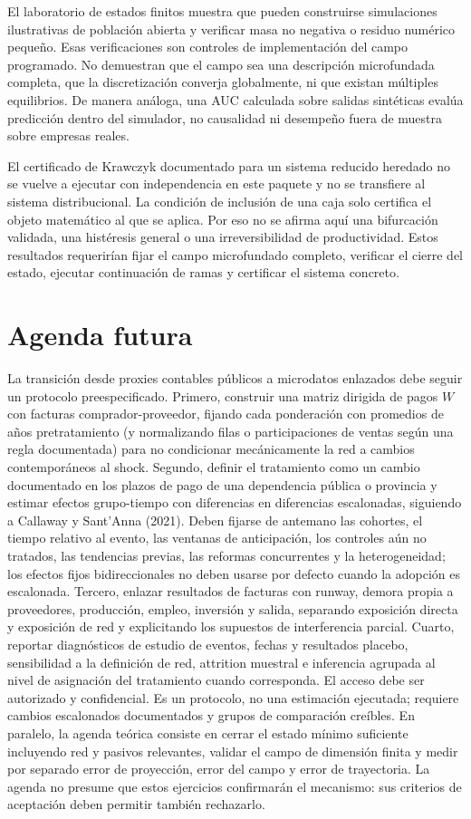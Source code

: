 \documentclass[11pt,a4paper]{article}
\begin{document}
El laboratorio de estados finitos muestra que pueden construirse simulaciones ilustrativas de población abierta y verificar masa no negativa o residuo numérico pequeño. Esas verificaciones son controles de implementación del campo programado. No demuestran que el campo sea una descripción microfundada completa, que la discretización converja globalmente, ni que existan múltiples equilibrios. De manera análoga, una AUC calculada sobre salidas sintéticas evalúa predicción dentro del simulador, no causalidad ni desempeño fuera de muestra sobre empresas reales.

El certificado de Krawczyk documentado para un sistema reducido heredado no se vuelve a ejecutar con independencia en este paquete y no se transfiere al sistema distribucional. La condición de inclusión de una caja solo certifica el objeto matemático al que se aplica. Por eso no se afirma aquí una bifurcación validada, una histéresis general o una irreversibilidad de productividad. Estos resultados requerirían fijar el campo microfundado completo, verificar el cierre del estado, ejecutar continuación de ramas y certificar el sistema concreto.

\section{Agenda futura}
La transición desde proxies contables públicos a microdatos enlazados debe seguir un protocolo preespecificado. Primero, construir una matriz dirigida de pagos $W$ con facturas comprador-proveedor, fijando cada ponderación con promedios de años pretratamiento (y normalizando filas o participaciones de ventas según una regla documentada) para no condicionar mecánicamente la red a cambios contemporáneos al shock. Segundo, definir el tratamiento como un cambio documentado en los plazos de pago de una dependencia pública o provincia y estimar efectos grupo-tiempo con diferencias en diferencias escalonadas, siguiendo a Callaway y Sant’Anna (2021). Deben fijarse de antemano las cohortes, el tiempo relativo al evento, las ventanas de anticipación, los controles aún no tratados, las tendencias previas, las reformas concurrentes y la heterogeneidad; los efectos fijos bidireccionales no deben usarse por defecto cuando la adopción es escalonada. Tercero, enlazar resultados de facturas con runway, demora propia a proveedores, producción, empleo, inversión y salida, separando exposición directa y exposición de red y explicitando los supuestos de interferencia parcial. Cuarto, reportar diagnósticos de estudio de eventos, fechas y resultados placebo, sensibilidad a la definición de red, attrition muestral e inferencia agrupada al nivel de asignación del tratamiento cuando corresponda. El acceso debe ser autorizado y confidencial. Es un protocolo, no una estimación ejecutada; requiere cambios escalonados documentados y grupos de comparación creíbles. En paralelo, la agenda teórica consiste en cerrar el estado mínimo suficiente incluyendo red y pasivos relevantes, validar el campo de dimensión finita y medir por separado error de proyección, error del campo y error de trayectoria. La agenda no presume que estos ejercicios confirmarán el mecanismo: sus criterios de aceptación deben permitir también rechazarlo.
\end{document}
